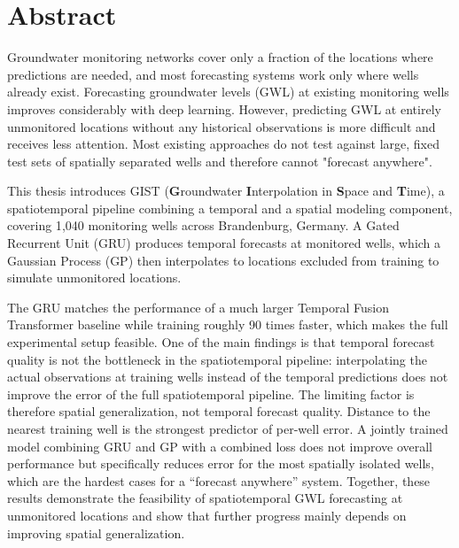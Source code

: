 \chapter*{Abstract}

Groundwater monitoring networks cover only a fraction of the locations where predictions are needed, and most forecasting systems work only where wells already exist.
Forecasting groundwater levels (GWL) at existing monitoring wells improves considerably with
deep learning. However, predicting GWL at entirely unmonitored locations without any
historical observations is more difficult and receives less attention. Most
existing approaches do not test against large, fixed test sets of spatially separated
wells and therefore cannot "forecast anywhere".

This thesis introduces GIST (\textbf{G}roundwater \textbf{I}nterpolation in \textbf{S}pace
and \textbf{T}ime), a spatiotemporal pipeline combining a temporal and a spatial modeling component,
covering 1{,}040 monitoring wells across Brandenburg, Germany.
A Gated Recurrent Unit (GRU) produces temporal forecasts at monitored wells, which a Gaussian Process
(GP) then interpolates to locations excluded from training to simulate unmonitored locations.

The GRU matches the performance of a much larger Temporal Fusion Transformer baseline while
training roughly 90 times faster, which makes the full experimental setup feasible. One of the main findings is that temporal forecast quality is not the bottleneck
in the spatiotemporal pipeline: interpolating the actual observations at training wells instead
of the temporal predictions does not improve the error of the full spatiotemporal pipeline. The limiting factor is therefore spatial generalization, not temporal forecast quality. Distance to the nearest training 
well is the strongest predictor of per-well error. A jointly trained model combining GRU and GP with a combined loss does not improve overall performance but specifically reduces error for the most spatially isolated wells,
which are the hardest cases for a ``forecast anywhere'' system.
Together, these results demonstrate the feasibility of spatiotemporal GWL forecasting at unmonitored locations and show that further progress mainly depends on improving spatial generalization.
